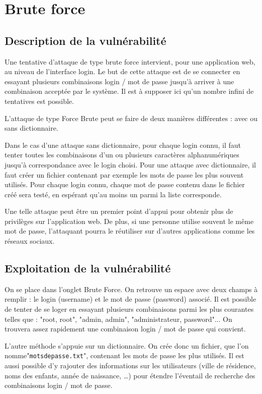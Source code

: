 \newpage

\section{Brute force}

\subsection{Description de la vulnérabilité}

Une tentative d'attaque de type brute force intervient, pour une application web, au niveau de l'interface login. Le but de cette attaque est de se connecter en essayant plusieurs combinaisons login / mot de passe jusqu'à arriver à une combinaison acceptée par le système. Il est à supposer ici qu'un nombre infini de tentatives est possible.

L'attaque de type Force Brute peut se faire de deux manières différentes : avec ou sans dictionnaire. 

Dans le cas d'une attaque sans dictionnaire, pour chaque login connu, il faut tenter toutes les combinaisons d'un ou plusieurs caractères alphanumériques jusqu'à correspondance avec le login choisi.
Pour une attaque avec dictionnaire, il faut créer un fichier contenant par exemple les mots de passe les plus souvent utilisés. Pour chaque login connu, chaque mot de passe contenu dans le fichier créé sera testé, en espérant qu'au moins un parmi la liste corresponde.

Une telle attaque peut être un premier point d'appui pour obtenir plus de privilèges sur l'application web. De plus, si une personne utilise souvent le même mot de passe, l'attaquant pourra le réutiliser sur d'autres applications comme les réseaux sociaux.


\subsection{Exploitation de la vulnérabilité}

On se place dans l'onglet Brute Force. On retrouve un espace avec deux champs à remplir : le login (username) et le mot de passe (password) associé. Il est possible de tenter de se loger en essayant plusieurs combinaisons parmi les plus courantes telles que : "root, root", "admin, admin", "administrateur, password"... On trouvera assez rapidement une combinaison login / mot de passe qui convient.

L'autre méthode s'appuie sur un dictionnaire. On crée donc un fichier, que l'on nomme\linebreak "\texttt{motsdepasse.txt}", contenant les mots de passe les plus utilisés. Il est aussi possible d'y rajouter des informations sur les utilisateurs (ville de résidence, noms des enfants, année de naissance, …) pour étendre l'éventail de recherche des combinaisons login / mot de passe.


